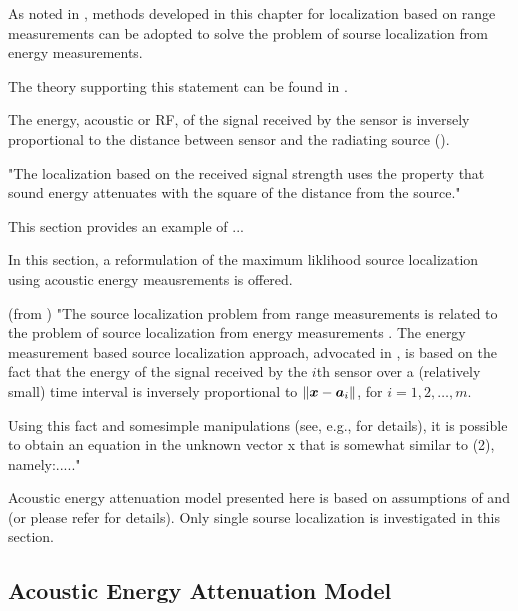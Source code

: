 As noted in \cite{StLi}, methods developed in this chapter for localization based on range measurements can be adopted to solve the problem of sourse localization from energy measurements. 

The theory supporting this statement can be found in \cite{LiHu,ShengHu,Saric,Cheung,CheungSo}.


The energy, acoustic or RF, of the signal received by the sensor is inversely proportional to the distance between sensor and the radiating source (\cite{LiHu,ShengHu,Saric,Cheung,CheungSo}).

"The localization based on the received signal strength uses the property that sound energy attenuates with the square of the distance from the source."

This section provides an example of ...

In this section, a reformulation of the maximum liklihood source localization using acoustic energy meausrements is offered.

(from \cite{StLi}) "The source localization problem from range measurements is related to the problem of source localization from energy measurements \cite{LiHu,ShengHu,Saric,Cheung,CheungSo}.
The energy measurement based source localization approach, advocated in \cite{LiHu}, \cite{Saric} is based on the fact that the energy of the signal received by the $i$th sensor over a (relatively small) time interval is inversely proportional to $\| \mbox{\boldmath$x$} - \mbox{\boldmath$a$}_i \|$, for $i = 1, 2, \ldots,m$. 

Using this fact and somesimple manipulations (see, e.g., \cite{LiHu} for details), it is possible to obtain an
equation in the unknown vector x that is somewhat similar to (2), namely:....."

Acoustic energy attenuation model presented here is based on assumptions of \cite{LiHu} and \cite{Saric} (or please refer for details). Only single sourse localization is investigated in this section.


\subsection{Acoustic Energy Attenuation Model}


